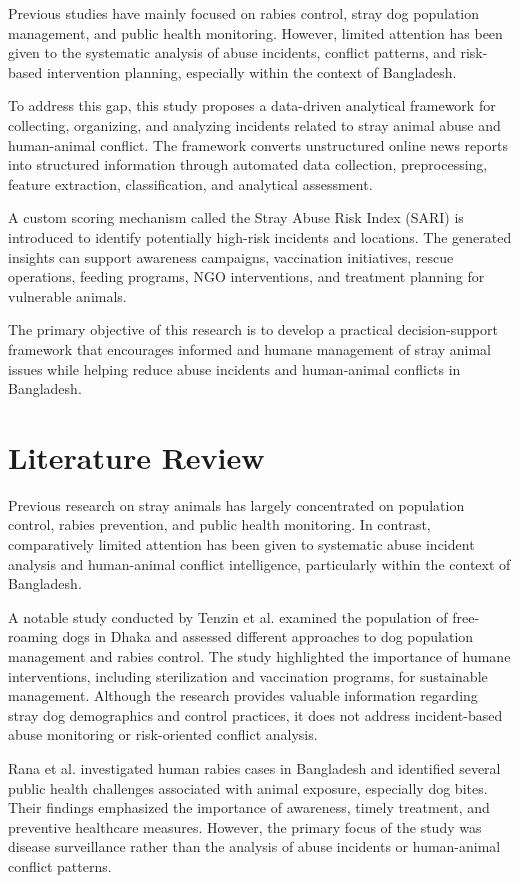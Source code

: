 \documentclass[conference]{IEEEtran}
\begin{document}
Previous studies have mainly focused on rabies control, stray dog population management, and public health monitoring. However, limited attention has been given to the systematic analysis of abuse incidents, conflict patterns, and risk-based intervention planning, especially within the context of Bangladesh.

To address this gap, this study proposes a data-driven analytical framework for collecting, organizing, and analyzing incidents related to stray animal abuse and human-animal conflict. The framework converts unstructured online news reports into structured information through automated data collection, preprocessing, feature extraction, classification, and analytical assessment.

A custom scoring mechanism called the Stray Abuse Risk Index (SARI) is introduced to identify potentially high-risk incidents and locations. The generated insights can support awareness campaigns, vaccination initiatives, rescue operations, feeding programs, NGO interventions, and treatment planning for vulnerable animals.

The primary objective of this research is to develop a practical decision-support framework that encourages informed and humane management of stray animal issues while helping reduce abuse incidents and human-animal conflicts in Bangladesh.

\section{Literature Review}

Previous research on stray animals has largely concentrated on population control, rabies prevention, and public health monitoring. In contrast, comparatively limited attention has been given to systematic abuse incident analysis and human-animal conflict intelligence, particularly within the context of Bangladesh.

A notable study conducted by Tenzin et al. \cite{tenzin2015} examined the population of free-roaming dogs in Dhaka and assessed different approaches to dog population management and rabies control. The study highlighted the importance of humane interventions, including sterilization and vaccination programs, for sustainable management. Although the research provides valuable information regarding stray dog demographics and control practices, it does not address incident-based abuse monitoring or risk-oriented conflict analysis.

Rana et al. \cite{rana2020} investigated human rabies cases in Bangladesh and identified several public health challenges associated with animal exposure, especially dog bites. Their findings emphasized the importance of awareness, timely treatment, and preventive healthcare measures. However, the primary focus of the study was disease surveillance rather than the analysis of abuse incidents or human-animal conflict patterns.
\end{document}
